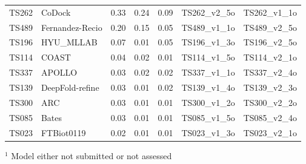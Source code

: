 \begin{table}[ht]
{\begin{tabular}{llrrrll}
TS262 & CoDock & 0.33 & 0.24 & 0.09 & TS262\_v2\_5o & TS262\_v1\_1o \\ 
TS489 & Fernandez-Recio & 0.20 & 0.15 & 0.05 & TS489\_v1\_1o & TS489\_v2\_5o \\ 
TS196 & HYU\_MLLAB & 0.07 & 0.01 & 0.05 & TS196\_v1\_3o & TS196\_v2\_5o \\ 
TS114 & COAST & 0.04 & 0.02 & 0.01 & TS114\_v1\_5o & TS114\_v2\_1o \\ 
TS337 & APOLLO & 0.03 & 0.02 & 0.02 & TS337\_v1\_1o & TS337\_v2\_4o \\ 
TS139 & DeepFold-refine & 0.03 & 0.01 & 0.02 & TS139\_v1\_4o & TS139\_v2\_3o \\ 
TS300 & ARC & 0.03 & 0.01 & 0.01 & TS300\_v1\_2o & TS300\_v2\_2o \\ 
TS085 & Bates & 0.03 & 0.01 & 0.01 & TS085\_v1\_5o & TS085\_v2\_4o \\ 
TS023 & FTBiot0119 & 0.02 & 0.01 & 0.01 & TS023\_v1\_3o & TS023\_v2\_1o \\ 
\bottomrule
\end{tabular}%
}
\begin{flushleft}\footnotesize $^{1}$ Model either not submitted or not assessed\end{flushleft}
\end{table}
